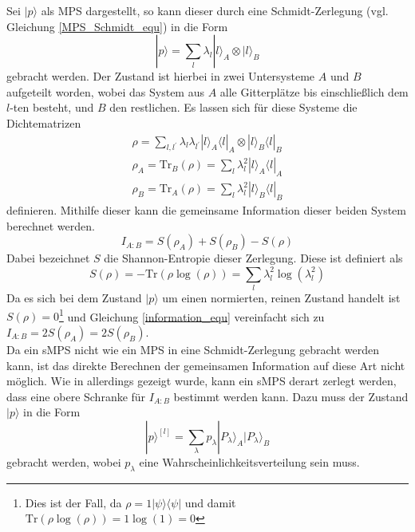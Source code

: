 \documentclass[10pt,a4paper]{report}
\begin{document}
Sei $|p\rangle$ als MPS dargestellt, so kann dieser durch eine Schmidt-Zerlegung (vgl. Gleichung \ref{MPS_Schmidt_equ}) in die Form 
\begin{equation}
|p\rangle=\sum_{l}\lambda_{l}|l\rangle_A\otimes|l\rangle_B
\end{equation}
gebracht werden. Der Zustand ist hierbei in zwei Untersysteme $A$ und $B$ aufgeteilt worden, wobei das System aus $A$ alle Gitterplätze bis einschließlich dem $l$-ten besteht, und $B$ den restlichen. Es lassen sich für diese Systeme die Dichtematrizen
\begin{equation}
\begin{split}
\rho=\sum_{l,l^{\prime}}\lambda_l\lambda_{l^{\prime}}|l\rangle_A\langle l|_A\otimes |l\rangle_B\langle l|_B\\
\rho_A=\text{Tr}_B(\rho)=\sum_{l}\lambda_l^2|l\rangle_A\langle l|_A\\
\rho_B=\text{Tr}_A(\rho)=\sum_{l}\lambda_l^2|l\rangle_B\langle l|_B
\end{split}
\end{equation}
definieren. Mithilfe dieser kann die gemeinsame Information dieser beiden System berechnet werden. 
\begin{equation}\label{information_equ}
I_{A:B}=S(\rho_A)+S(\rho_B)-S(\rho)
\end{equation}
Dabei bezeichnet $S$ die Shannon-Entropie dieser Zerlegung. Diese ist definiert als
\begin{equation}
S(\rho)=-\text{Tr}(\rho\log(\rho))=\sum_l\lambda_l^2\log(\lambda_l^2)
\end{equation} 
Da es sich bei dem Zustand $|p\rangle$ um einen normierten, reinen Zustand handelt ist $S(\rho)=0$\footnote{Dies ist der Fall, da $\rho=1|\psi\rangle\langle\psi|$ und damit $\text{Tr}(\rho\log(\rho))=1\log(1)=0$} und Gleichung \ref{information_equ} vereinfacht sich zu $I_{A:B}=2S(\rho_A)=2S(\rho_B)$.\cite{Entropy}\\


Da ein sMPS nicht wie ein MPS in eine Schmidt-Zerlegung gebracht werden kann, ist das direkte Berechnen der gemeinsamen Information auf diese Art nicht möglich. Wie in \cite{sMPS} allerdings gezeigt wurde, kann ein sMPS derart zerlegt werden, dass eine obere Schranke für $I_{A:B}$ bestimmt werden kann. Dazu muss der Zustand $|p\rangle$ in die Form
\begin{equation}
|p\rangle^{[l]}=\sum_{\lambda}p_{\lambda}|P_{\lambda}\rangle_A|P_{\lambda}\rangle_B
\end{equation}
gebracht werden, wobei $p_{\lambda}$ eine Wahrscheinlichkeitsverteilung sein muss.
\end{document}
